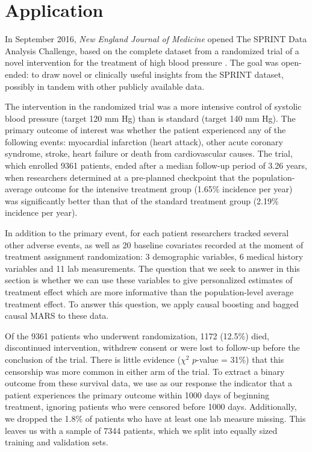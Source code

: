 \documentclass{article}
\begin{document}
\section{Application}
\label{sec-application}
In September 2016, {\it New England Journal of Medicine} opened The SPRINT Data
Analysis Challenge, based on the complete dataset from a
randomized trial of a novel intervention for the treatment of high blood
pressure \citep{SPRINT15}. The goal was open-ended: to draw novel or clinically
useful insights from the SPRINT dataset, possibly in tandem with other publicly
available data.

The intervention in the randomized trial \citep{SPRINT15} was a more intensive
control of systolic blood pressure (target 120 mm Hg) than is standard
(target 140 mm Hg). The primary outcome of interest was whether the patient
experienced any of the following events: myocardial infarction (heart attack),
other acute coronary syndrome, stroke, heart failure or death from
cardiovascular causes. The trial, which enrolled 9361 patients, ended after a
median follow-up period of 3.26 years, when researchers determined at a
pre-planned checkpoint that the population-average outcome for the intensive
treatment group (1.65\% incidence per year) was significantly
better than that of the standard treatment group (2.19\% incidence per year).

In addition to the primary event, for each patient researchers tracked several
other adverse events, as well as 20 baseline covariates recorded at the moment
of treatment assignment randomization: 3 demographic variables, 6 medical
history variables and 11 lab measurements. The question that we seek to answer
in this section is whether we can use these variables to give personalized
estimates of treatment effect which are more informative than the
population-level average treatment effect. To answer this question, we apply
causal boosting and bagged causal MARS to these data.

Of the 9361 patients who underwent randomization, 1172 (12.5\%) died,
discontinued intervention, withdrew consent or were lost to follow-up before
the conclusion of the trial. There is little evidence
($\chi^2$ $p$-value = 31\%) that this censorship was more common in either arm
of the trial. To extract a binary outcome from these survival data, we use as
our response the indicator that a patient experiences the primary outcome
within 1000 days of beginning treatment, ignoring patients who were censored
before 1000 days. Additionally, we dropped the 1.8\% of patients who have at
least one lab measure missing. This leaves us with a sample of 7344 patients,
which we split into equally sized training and validation sets.
\end{document}
